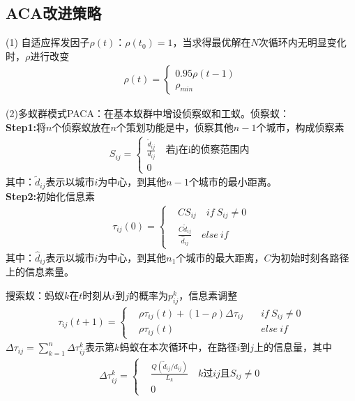     \subsection{ACA改进策略}
        \par
        (1) 自适应挥发因子$\rho(t)$：$\rho(t_0)=1$，当求得最优解在$N$次循环内无明显变化时，$\rho $进行改变
        \begin{align*}
        \rho(t) = \left\{
        \begin{aligned}
        0.95\rho(t-1)\\
        \rho_{min}
        \end{aligned}
        \right.
        \end{align*}
        \par
        (2)多蚁群模式PACA：在基本蚁群中增设侦察蚁和工蚁。侦察蚁：\\
        \textbf{Step1:}将$n$个侦察蚁放在$n$个策划功能是中，侦察其他$n-1$个城市，构成侦察素
        \begin{align*}
        S_{ij} = \left\{
        \begin{aligned}
        \frac{\tilde{d}_{ij}}{d_{ij}} \quad\text{若j在i的侦察范围内}\\
        0
        \end{aligned}
        \right.
        \end{align*}
        其中：$\tilde{d}_{ij}$表示以城市$i$为中心，到其他$n-1$个城市的最小距离。\\
        \textbf{Step2:}初始化信息素
        \begin{align*}
        \tau_{ij}(0) = \left\{
        \begin{aligned}
        &CS_{ij} \quad if\  S_{ij} \neq 0\\
        &\frac{C\tilde{d}_{ij}}{\hat{d}_{ij}}\quad else\ if
        \end{aligned}
        \right.
        \end{align*}
        其中：$\hat{d}_{ij}$表示以城市$i$为中心，到其他$n_1$个城市的最大距离，$C$为初始时刻各路径上的信息素量。
        \par
        搜索蚁：蚂蚁$k$在$t$时刻从$i$到$j$的概率为$p_{ij}^k$，信息素调整
        \begin{align*}
        \tau_{ij}(t+1) = \left\{
        \begin{aligned}
        & \rho \tau_{ij}(t)+(1-\rho)\Delta\tau_{ij}&\quad if\ S_{ij} \neq 0\\
        & \rho \tau_{ij}(t) &\quad else \ if
        \end{aligned}
        \right.
        \end{align*}
        $\Delta\tau_{ij} = \sum_{k=1}^n\Delta\tau_{ij}^k$表示第$k$蚂蚁在本次循环中，在路径$i$到$j$上的信息量，其中
        \begin{align*}
        \Delta\tau_{ij}^k =\left\{
        \begin{aligned}
        & \frac{Q(\tilde{d}_{ij}/d_{ij})}{L_k} \quad k\text{过}ij\text{且}S_{ij}\neq 0\\
        & 0
        \end{aligned}
        \right.
        \end{align*}

